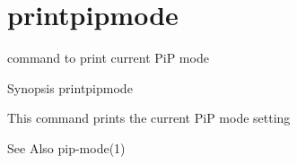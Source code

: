 \hypertarget{group__printpipmode}{\section{printpipmode}
\label{group__printpipmode}
}


command to print current Pi\-P mode  


\begin{DoxyParagraph}{Synopsis}
printpipmode
\end{DoxyParagraph}
This command prints the current Pi\-P mode setting

\begin{DoxySeeAlso}{See Also}
pip-\/mode(1) 
\end{DoxySeeAlso}

